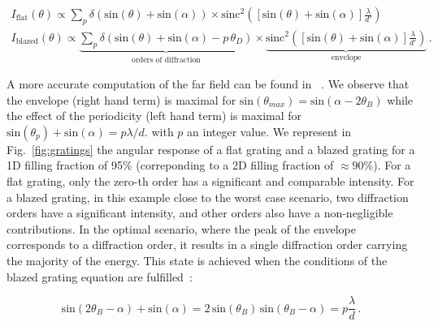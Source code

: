 \documentclass[12pt]{iopart}
\begin{document}
\begin{optional}
  \begin{equation}
    \begin{aligned}
      I_\text{flat}(\theta) \propto
      \sum_p \delta(\text{sin}(\theta)+\text{sin}(\alpha))
      \times
      \text{sinc}^2\left( \left[\text{sin}(\theta)+\text{sin}(\alpha)\right] \frac{\lambda}{d'}\right) \\
      I_\text{blazed}(\theta) \propto
      \underbrace{
        \sum_p \delta(\text{sin}(\theta)+\text{sin}(\alpha)-p\,\theta_D)
      }_\text{orders of diffraction}
      \times
      \underbrace{
        \text{sinc}^2\left( \left[\text{sin}(\theta)+\text{sin}(\alpha)\right] \frac{\lambda}{d'}\right)
      }_\text{envelope} \, .
    \end{aligned}
  \end{equation}

\end{optional}
A more accurate computation of the far field can be found  in ~\cite{Wang2023diffraction}.
We observe that the envelope (right hand term) is maximal for $\text{sin}(\theta_{max}) = \text{sin}(\alpha-2\theta_B)$
while the effect of the periodicity (left hand term) is maximal for $\text{sin}(\theta_p)+ \text{sin}(\alpha) = p \lambda/d$.
with $p$ an integer value.
We represent in Fig.~\ref{fig:gratings} the angular response of a flat grating and a blazed grating
for a 1D filling fraction of 95\% (correponding to a 2D filling fraction of $\approx 90$\%).
For a flat grating, only the zero-th order has a significant and comparable intensity.
For a blazed grating, in this example close to the worst case scenario,
two diffraction orders have a significant intensity,
and other orders also have a non-negligible contributions.
In the optimal scenario, where the peak of the envelope corresponds to a diffraction order,
it results in a single diffraction order carrying the majority of the energy.
This state is achieved when the conditions of the blazed grating equation are fulfilled~\cite{Casini2014on}:



\begin{equation}
  \text{sin}(2\theta_B-\alpha) + \text{sin}(\alpha)
  = 2 \,\text{sin}(\theta_B)  \,\text{sin}(\theta_B-\alpha)
  = p\frac{\lambda}{d} \, .
  \label{eq:blazed_eq}
\end{equation}
\end{document}
